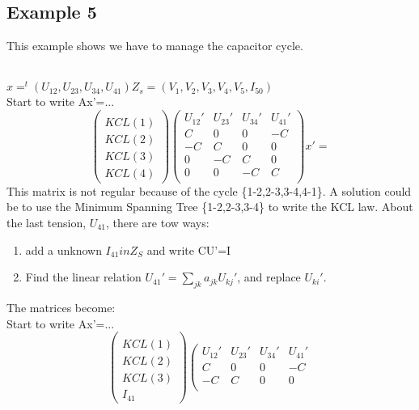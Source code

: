  
\subsection{Example 5}
This example shows we have to manage the capacitor cycle.\\
\begin{figure}[h]
\centerline{
 \scalebox{0.6}{
    
 }
}\end{figure}\\
$x=^{t}(U_{12},U_{23},U_{34},U_{41})$$Z_{s}=(V_{1},V_{2},V_{3},V_{4},V_{5},I_{50})$\\
Start to write Ax'=...\
\[\left(\begin{array}{c}
  \\
KCL(1)\\KCL(2)\\KCL(3)\\KCL(4)
\end{array}\right)
\left(\begin{array}{cccc}
  U_{12}'&U_{23}'&U_{34}'&U_{41}'\\
  \hline
  C&0&0&-C\\
  -C&C&0&0\\
  0&-C&C&0\\
  0&0&-C&C\\  
\end{array}\right)x'=
\]
This matrix is not regular because of the cycle \{1-2,2-3,3-4,4-1\}. A solution could be to use the Minimum
Spanning Tree \{1-2,2-3,3-4\} to write the KCL law. About the last tension, $U_{41}$, there are tow
ways:
\begin{enumerate}
\item add a unknown $I_{41} in Z_{S}$ and write CU'=I
\item Find the linear relation $U_{41}'= \sum_{jk}^{}a_{jk}U_{kj}'$, and replace $U_{ki}'$.
\end{enumerate}
The matrices become:\\
Start to write Ax'=...\
\[\left(\begin{array}{c}
  \\
KCL(1)\\KCL(2)\\KCL(3)\\I_{41}
\end{array}\right)
\left(\begin{array}{cccc}
  U_{12}'&U_{23}'&U_{34}'&U_{41}'\\
  \hline
  C&0&0&-C\\
  -C&C&0&0\\

\end{array}\]$$
